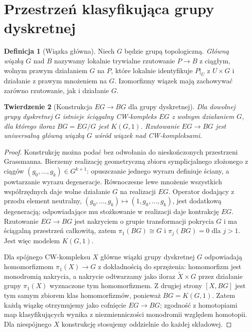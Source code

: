 \documentclass[11pt,a4paper,oneside]{report}
\theoremstyle{plain}
\newtheorem{twierdzenie}{Twierdzenie}[section]
\theoremstyle{definition}
\newtheorem{definicja}[twierdzenie]{Definicja}
\theoremstyle{remark}
\begin{document}
\section{Przestrzeń klasyfikująca grupy dyskretnej}
\begin{definicja}[Wiązka główna]
Niech $G$ będzie grupą topologiczną. \emph{Główną
wiązką $G$} nad $B$ nazywamy lokalnie trywialne
rzutowanie $P\to B$ z ciągłym, wolnym prawym działaniem
$G$ na $P$, które lokalnie identyfikuje $P|_U$
z $U\times G$ i działanie z prawym mnożeniem na $G$.
Izomorfizmy wiązek mają zachowywać zarówno rzutowanie,
jak i działanie $G$.
\end{definicja}

\begin{twierdzenie}[Konstrukcja $EG\to BG$ dla grupy dyskretnej]
\label{thm:bar-BG-v6}
Dla dowolnej grupy dyskretnej $G$ istnieje
ściągalny CW-kompleks $EG$ z wolnym działaniem $G$,
dla którego iloraz $BG=EG/G$ jest $K(G,1)$.
Rzutowanie $EG\to BG$ jest uniwersalną główną
wiązką $G$ wśród wiązek nad CW-kompleksami.
\end{twierdzenie}
\begin{proof}
Konstrukcję można podać bez odwołania do
nieskończonych przestrzeni Grassmanna. Bierzemy
realizację geometryczną zbioru symplicjalnego
złożonego z ciągów $(g_0,\ldots,g_k)\in G^{k+1}$:
opuszczanie jednego wyrazu definiuje ściany,
a powtarzanie wyrazu degeneracje. Równoczesne
lewe mnożenie wszystkich współrzędnych daje wolne
działanie $G$ na realizacji $EG$. Operator dodający
z przodu element neutralny,
$(g_0,\ldots,g_k)\mapsto(1,g_0,\ldots,g_k)$,
jest dodatkową degeneracją; odpowiadające mu stożkowanie
w realizacji daje kontrakcję $EG$.
Rzutowanie $EG\to BG$ jest nakryciem o grupie
transformacji pokrycia $G$ i ma ściągalną przestrzeń
całkowitą, zatem $\pi_1(BG)\cong G$ i
$\pi_j(BG)=0$ dla $j>1$. Jest więc modelem $K(G,1)$.

Dla spójnego CW-kompleksu $X$ główne wiązki
grupy dyskretnej $G$ odpowiadają homomorfizmom
$\pi_1(X)\to G$ z dokładnością do sprzężenia:
homomorfizm jest monodromią nakrycia, a nakrycie
odtwarzamy jako iloraz $\widetilde X\times G$
przez działanie grupy $\pi_1(X)$ wyznaczone tym
homomorfizmem. Z drugiej strony
$[X,BG]$ jest tym samym zbiorem klas homomorfizmów,
ponieważ $BG=K(G,1)$. Zatem każdą wiązkę otrzymujemy
jako cofnięcie $EG\to BG$; zgodność z homotopiami
map klasyfikujących wynika z niezmienniczości
monodromii względem homotopii.
Dla niespójnego $X$ konstrukcję stosujemy oddzielnie
do każdej składowej.
\end{proof}
\end{document}

